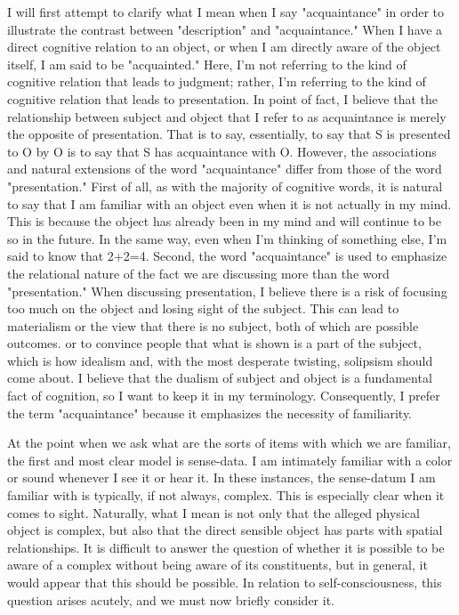 \documentclass[a4paper,12pt]{book}[2004/02/16]
\theoremstyle{ilemma}
\theoremstyle{itheorem}
\theoremstyle{iother}
\theoremstyle{icorollary}
\theoremstyle{numcorollary}
\theoremstyle{idefinition}
\begin{document}
I will first attempt to clarify what I mean when I say "acquaintance" in order to illustrate the contrast between "description" and "acquaintance." When I have a direct cognitive relation to an object, or when I am directly aware of the object itself, I am said to be "acquainted." Here, I'm not referring to the kind of cognitive relation that leads to judgment; rather, I'm referring to the kind of cognitive relation that leads to presentation. In point of fact, I believe that the relationship between subject and object that I refer to as acquaintance is merely the opposite of presentation. That is to say, essentially, to say that S is presented to O by O is to say that S has acquaintance with O. However, the associations and natural extensions of the word "acquaintance" differ from those of the word "presentation." First of all, as with the majority of cognitive words, it is natural to say that I am familiar with an object even when it is not actually in my mind. This is because the object has already been in my mind and will continue to be so in the future. In the same way, even when I'm thinking of something else, I'm said to know that 2+2=4. Second, the word "acquaintance" is used to emphasize the relational nature of the fact we are discussing more than the word "presentation." When discussing presentation, I believe there is a risk of focusing too much on the object and losing sight of the subject. This can lead to materialism or the view that there is no subject, both of which are possible outcomes. or to convince people that what is shown is a part of the subject, which is how idealism and, with the most desperate twisting, solipsism should come about. I believe that the dualism of subject and object is a fundamental fact of cognition, so I want to keep it in my terminology. Consequently, I prefer the term "acquaintance" because it emphasizes the necessity of familiarity.

At the point when we ask what are the sorts of items with which we are
familiar, the first and most clear model is sense-data. I am intimately familiar with a color or sound whenever I see it or hear it. In these instances, the sense-datum I am familiar with is typically, if not always, complex. This is especially clear when it comes to sight. Naturally, what I mean is not only that the alleged physical object is complex, but also that the direct sensible object has parts with spatial relationships. It is difficult to answer the question of whether it is possible to be aware of a complex without being aware of its constituents, but in general, it would appear that this should be possible. In relation to self-consciousness, this question arises acutely, and we must now briefly consider it.
\end{document}
